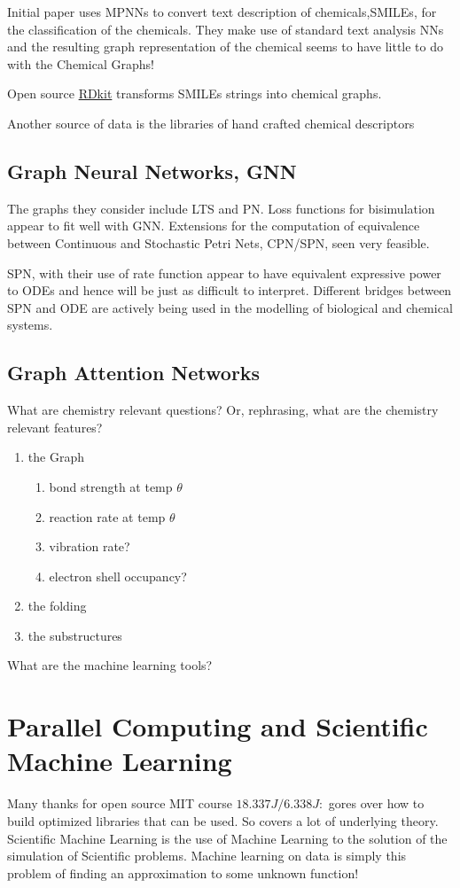 Initial paper uses MPNNs to convert text description of chemicals,SMILEs, for the classification of the chemicals. They make use of standard text analysis NNs and  the resulting graph representation of the chemical seems to have little to do with the Chemical Graphs!

Open source \href{https://www.rdkit.org/} {RDkit} transforms SMILEs strings into chemical graphs.

Another source of data is the libraries of hand crafted chemical  descriptors


\subsection{Graph Neural Networks, GNN}
The graphs they consider include LTS and PN.  Loss functions for bisimulation appear to fit well with GNN. Extensions for the computation of equivalence between Continuous and Stochastic Petri Nets, CPN/SPN, seen very feasible.

SPN, with their use of rate function appear to have equivalent expressive power to ODEs and hence will be just as difficult to interpret. Different bridges between SPN and ODE are actively being used in the modelling of biological and chemical systems.


\subsection{Graph Attention Networks}



What are chemistry relevant questions? Or, rephrasing, what are the chemistry relevant features?
\begin{enumerate}
\item the Graph
\begin{enumerate}
\item bond strength at temp $\theta$ 
\item reaction rate  at temp $\theta$
\item vibration rate?
\item electron shell occupancy?
\end{enumerate}
\item the folding
\item the substructures
\end{enumerate}

What are the machine learning tools?


\section{Parallel Computing and Scientific Machine Learning} 
Many thanks for open source  MIT course $18.337J/6.338J:$ gores over how to build optimized libraries that can be used. So covers a lot of  underlying theory.
Scientific Machine Learning is the use of Machine Learning to the solution of the simulation of Scientific problems. Machine learning on data is simply this problem of finding an approximation to some unknown function!

